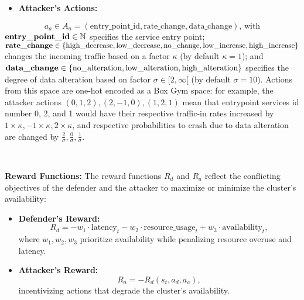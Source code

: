 \documentclass[conference]{IEEEtran}
\begin{document}
\begin{itemize}
    \item \textbf{Attacker's Actions:} 
\end{itemize}
$$
a_a \in A_a = (\text{entry\_point\_id}, \text{rate\_change}, \text{data\_change}) \text{, with}
$$
$\text{\textbf{entry\_point\_id}} \in \mathbb{N}$ specifies the service entry point;
$\text{\textbf{rate\_change}} \in \{\text{high\_decrease}, \text{low\_decrease}, \text{no\_change}, \allowbreak \text{low\_increase}, \allowbreak \text{high\_increase}\}$ changes the incoming traffic based on a factor $\kappa$ (by default $\kappa = 1$); and $\text{\textbf{data\_change}} \in \{\text{no\_alteration}, \allowbreak \text{low\_alteration}, \allowbreak \text{high\_alteration}\}$ specifies the degree of data alteration based on factor $\sigma \in [2,\infty[$ (by default $\sigma = 10$). Actions from this space are one-hot encoded as a Box Gym space: for example, the attacker actions $(0,1,2), (2,-1,0), (1,2,1)$ mean that entrypoint services id number 0, 2, and 1 would have their respective traffic-in rates increased by $1 \times \kappa, -1 \times \kappa, 2 \times \kappa$, and respective probabilities to crash due to data alteration are changed by $\frac{2}{\sigma}, \frac{0}{\sigma}, \frac{1}{\sigma}$.



\

\noindent \textbf{Reward Functions:} The reward functions $R_d$ and $R_a$ reflect the conflicting objectives of the defender and the attacker to maximize or minimize the cluster's availability:
\begin{itemize}
    \item \textbf{Defender's Reward:}
    $$
    R_d = -w_1 \cdot \text{latency}_t - w_2 \cdot \text{resource\_usage}_t + w_3 \cdot \text{availability}_t,
    $$
    where $w_1, w_2, w_3$ prioritize availability while penalizing resource overuse and latency.
    \item \textbf{Attacker's Reward:}
    $$
    R_a = -R_d(s_t, a_d, a_a),
    $$
    incentivizing actions that degrade the cluster's availability.
\end{itemize}
\end{document}

